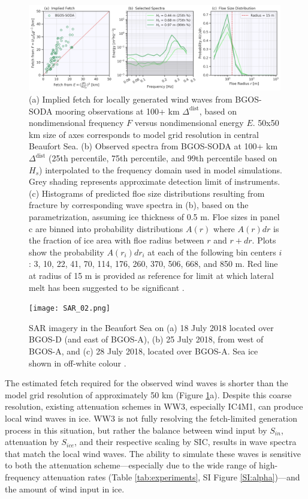 \documentclass [11pt, proquest] {uwthesis}[2020/02/24]
\begin{document}
\begin{figure}
    \noindent\includegraphics[width=0.99\textwidth]{fetch-frac_03.png}
    \caption{(a) Implied fetch for locally generated wind waves from BGOS-SODA mooring observations at 100+ km $\Delta^{ \mathrm{dist}}$, based on nondimensional frequency $F$ versus nondimensional energy $E$. 50x50 km size of axes corresponds to model grid resolution in central Beaufort Sea. (b) Observed spectra from BGOS-SODA at 100+ km $\Delta^{ \mathrm{dist}}$ (25th percentile, 75th percentile, and 99th percentile based on $H_s$) interpolated to the frequency domain used in model simulations. Grey shading represents approximate detection limit of instruments. (c) Histograms of predicted floe size distributions resulting from fracture by corresponding wave spectra in (b), based on the \cite{Horvat2015} parametrization, assuming ice thickness of 0.5 m. Floe sizes in panel c are binned into probability distributions $A(r)$ where $A(r)dr$ is the fraction of ice area with floe radius between $r$ and $r + dr$. Plots show the probability $A(r_i)dr_i$ at each of the following bin centers $i$: 3, 10, 22, 41, 70, 114, 176, 260, 370, 506, 668, and 850 m. Red line at radius of 15 m is provided as reference for limit at which lateral melt has been suggested to be significant \cite{Steele1992SeaModel}.}
    \label{fig:fetch-frac}
\end{figure}

\begin{figure}
    \noindent\texttt{[image: SAR\_02.png]}
    \caption{SAR imagery in the Beaufort Sea on (a) 18 July 2018 located over BGOS-D (and east of BGOS-A), (b) 25 July 2018, from west of BGOS-A, and (c) 28 July 2018, located over BGOS-A. Sea ice shown in off-white colour \cite{SentinelHubEOBrowser, RaspaudSAR-Ice:Composite}.}
    \label{fig:SAR}
\end{figure}

The estimated fetch required for the observed wind waves is shorter than the model grid resolution of approximately 50 km (Figure \ref{fig:fetch-frac}a). Despite this coarse resolution, existing attenuation schemes in WW3, especially IC4M1, can produce local wind waves in ice. WW3 is not fully resolving the fetch-limited generation process in this situation, but rather the balance between wind input by $S_{in}$, attenuation by $S_{ice}$, and their respective scaling by SIC, results in wave spectra that match the local wind waves. The ability to simulate these waves is sensitive to both the attenuation scheme---especially due to the wide range of high-frequency attenuation rates (Table \ref{tab:experiments}, SI Figure \ref{SI:alpha})---and the amount of wind input in ice.  
\end{document}
